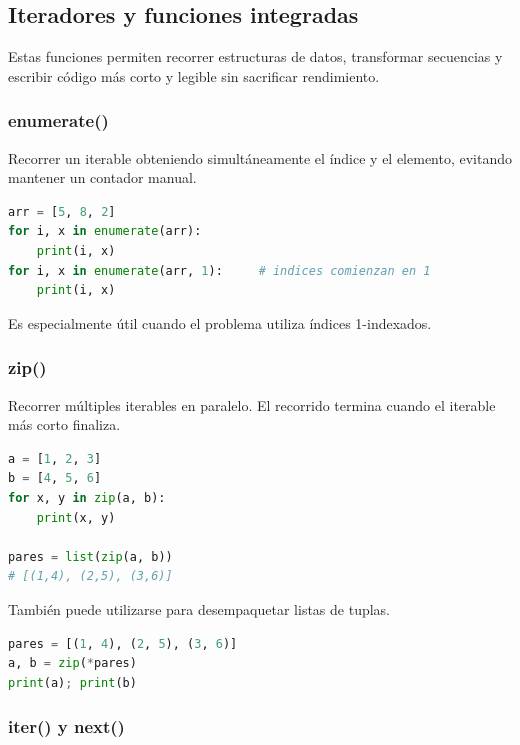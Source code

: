 \subsection{Iteradores y funciones integradas}
\label{alg:2-1}

Estas funciones permiten recorrer estructuras de datos, transformar secuencias y escribir código más corto y legible sin sacrificar rendimiento.

\subsubsection{enumerate()}

Recorrer un iterable obteniendo simultáneamente el índice y el elemento, evitando mantener un contador manual.

\begin{lstlisting}[language=Python]
arr = [5, 8, 2]
for i, x in enumerate(arr):
    print(i, x)
for i, x in enumerate(arr, 1):     # indices comienzan en 1
    print(i, x)
\end{lstlisting}

Es especialmente útil cuando el problema utiliza índices 1-indexados.

\vspace{0.3cm}

\subsubsection{zip()}

Recorrer múltiples iterables en paralelo. El recorrido termina cuando el iterable más corto finaliza.

\begin{lstlisting}[language=Python]
a = [1, 2, 3]
b = [4, 5, 6]
for x, y in zip(a, b):
    print(x, y)

pares = list(zip(a, b))
# [(1,4), (2,5), (3,6)]
\end{lstlisting}

También puede utilizarse para desempaquetar listas de tuplas.

\begin{lstlisting}[language=Python]
pares = [(1, 4), (2, 5), (3, 6)]
a, b = zip(*pares)
print(a); print(b)
\end{lstlisting}

\vspace{0.3cm}

\subsubsection{iter() y next()}

